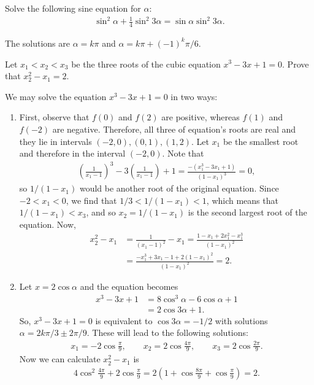 \begin{question}
    Solve the following sine equation for $\alpha$:
    \begin{align*}
        \sin^2 \alpha + \frac{1}{4}\sin^2 3\alpha = \sin\alpha \sin^2 3\alpha.
    \end{align*}
\end{question}

\begin{solution}
    The solutions are $\alpha=k\pi$ and $\alpha=k\pi+(-1)^k\pi/6$.
\end{solution}


\begin{question}
    Let $x_1<x_2<x_3$ be the three roots of the cubic equation $x^3-3x+1=0$. Prove that $x_2^2-x_1=2$.
\end{question}

\begin{solution}
    We may solve the equation $x^3-3x+1=0$ in two ways:
    \begin{enumerate}
        \item First, observe that $f(0)$ and $f(2)$ are positive, whereas $f(1)$ and $f(-2)$ are negative. Therefore, all three of equation's roots are real and they lie in intervals $(-2,0), (0,1), (1,2)$. Let $x_1$ be the smallest root and therefore in the interval $(-2,0)$. Note that
        \begin{align*}
            \left(\frac{1}{x_1-1}\right)^3 - 3\left(\frac{1}{x_1-1}\right) + 1 = \frac{-(x_1^3-3x_1+1)}{(1-x_1)^3}=0,
        \end{align*}
        so $1/(1-x_1)$ would be another root of the original equation. Since $-2< x_1 < 0$, we find that $1/3 < 1/(1-x_1) < 1$, which means that $1/(1-x_1) < x_3$, and so $x_2=1/(1-x_1)$ is the second largest root of the equation. Now,
        \begin{align*}
            x_2^2 - x_1 &= \frac{1}{(x_1-1)^2} - x_1 = \frac{1-x_1+2x_1^2-x_1^3}{(1-x_1)^2}\\
            &= \frac{-x_1^3 + 3x_1 - 1 + 2(1-x_1)^2}{(1-x_1)^2}= 2.
        \end{align*}
        \item Let $x=2\cos\alpha$ and the equation becomes
        \begin{align*}
            x^3-3x+1 &= 8\cos^3 \alpha - 6\cos \alpha + 1 \\
            &= 2\cos3\alpha + 1.
        \end{align*}
        So, $x^3-3x+1=0$ is equivalent to $\cos 3\alpha = -1/2$ with solutions $\alpha = 2k\pi/3 \pm 2\pi/9$. These will lead to the following solutions:
        \begin{align*}
            x_1 = -2\cos\frac{\pi}{9},\qquad x_2 = 2\cos\frac{4\pi}{9}, \qquad x_3=2\cos\frac{2\pi}{9}.
        \end{align*}
        Now we can calculate $x_2^2-x_1$ is
        \begin{align*}
            4\cos^2\frac{4\pi}{9} + 2\cos\frac{\pi}{9} = 2\left(1+\cos\frac{8\pi}{9}+\cos\frac{\pi}{9}\right) = 2.
        \end{align*}
    \end{enumerate}
\end{solution}


